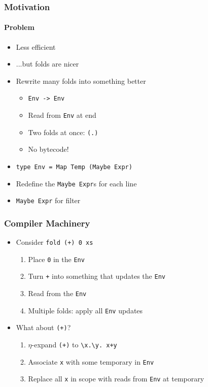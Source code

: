\documentclass{beamer}
\begin{document}
\begin{frame}[fragile]
  \frametitle{Motivation}
  \framesubtitle{Problem}
  \begin{itemize}
    \item Less efficient
    \item ...but folds are nicer
    \item Rewrite many folds into something better
      \begin{itemize}
        \item \verb|Env -> Env|
        \item Read from \verb|Env| at end
        \item Two folds at once: \verb|(.)|
        \item No bytecode!
      \end{itemize}
    \item
      \begin{verbatim}
type Env = Map Temp (Maybe Expr)
      \end{verbatim}
    \item Redefine the \verb|Maybe Expr|s for each line
    \item \verb|Maybe Expr| for filter
  \end{itemize}
\end{frame}

\begin{frame}[fragile]
  \frametitle{Compiler Machinery}
  \begin{itemize}
    \item Consider \verb|fold (+) 0 xs|
    \begin{enumerate}
      \item Place \verb|0| in the \verb|Env|
      \item Turn \verb|+| into something that updates the \verb|Env|
      \item Read from the \verb|Env|
      \item Multiple folds: apply all \verb|Env| updates
    \end{enumerate}
    \item What about \verb|(+)|?
    \begin{enumerate}
      \item $\eta$-expand \verb|(+)| to \verb|\x.\y. x+y|
      \item Associate \verb|x| with some temporary in \verb|Env|
      \item Replace all \verb|x| in scope with reads from \verb|Env| at temporary
    \end{enumerate}
  \end{itemize}
\end{frame}
\end{document}
